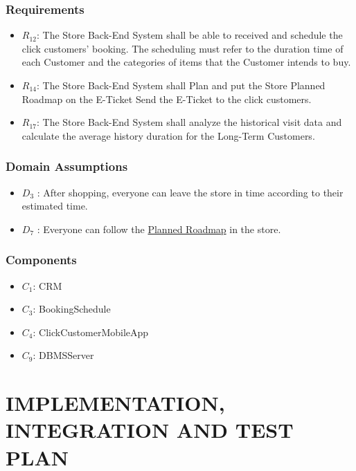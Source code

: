 \documentclass[a4paper,12pt]{report}
\begin{document}
\subsection{Requirements}

\begin{itemize}
	\item $R_{12}$: The Store Back-End System shall be able to received and schedule the click customers' booking. The scheduling must refer to the duration time of each Customer and the categories of items that the Customer intends to buy.
	\item $R_{14}$: The Store Back-End System shall Plan and put the Store Planned Roadmap on the E-Ticket Send the E-Ticket to the click customers.
	\item $R_{17}$: The Store Back-End System shall analyze the historical visit data and calculate the average history duration for the Long-Term Customers.
\end{itemize}

\subsection{Domain Assumptions}

\begin{itemize}
	\item $D_3$ : After shopping, everyone can leave the store in time according to their estimated time.
	\item $D_7$ : Everyone can follow the \hyperref[Definitions]{Planned Roadmap} in the store.
\end{itemize}

\subsection{Components}

\begin{itemize}
	\item $C_1$: CRM
	\item $C_3$: BookingSchedule
	\item $C_4$: ClickCustomerMobileApp
	\item $C_{9}$: DBMSServer
\end{itemize}



\chapter{IMPLEMENTATION, INTEGRATION AND TEST PLAN} \label{ch:implementation-integration-and-test-plan}
\end{document}
